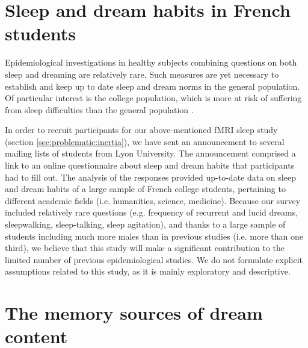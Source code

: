 \section{Sleep and dream habits in French students}
\label{sec:problematic:survey}

Epidemiological investigations in healthy subjects combining questions on both sleep and dreaming are relatively rare. Such measures are yet necessary to establish and keep up to date sleep and dream norms in the general population. Of particular interest is the college population, which is more at risk of suffering from sleep difficulties than the general population \citep{buboltz_sleep_2001, curcio_sleep_2006, forquer_sleep_2008, lund_sleep_2010}.

In order to recruit participants for our above-mentioned fMRI sleep study (section \ref{sec:problematic:inertia}), we have sent an announcement to several mailing lists of students from Lyon University. The announcement comprised a link to an online questionnaire about sleep and dream habits that participants had to fill out. The analysis of the responses provided up-to-date data on sleep and dream habits of a large sample of French college students, pertaining to different academic fields (i.e. humanities, science, medicine). Because our survey included relatively rare questions (e.g. frequency of recurrent and lucid dreams, sleepwalking, sleep-talking, sleep agitation), and thanks to a large sample of students including much more males than in previous studies (i.e. more than one third), we believe that this study will make a significant contribution to the limited number of previous epidemiological studies. We do not formulate explicit assumptions related to this study, as it is mainly exploratory and descriptive.

\section{The memory sources of dream content}
\label{sec:problematic:wle}

